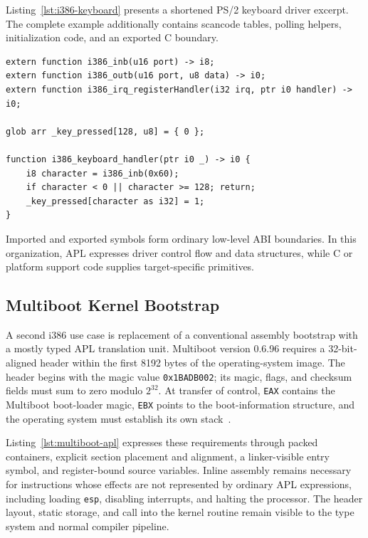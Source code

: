 \documentclass[10pt,twocolumn]{article}
\begin{document}
\par Listing~\ref{lst:i386-keyboard} presents a shortened PS/2 keyboard driver excerpt. The complete example additionally contains scancode tables, polling helpers, initialization code, and an exported C boundary.

\begin{lstlisting}[language=APL,caption={Shortened i386 PS/2 keyboard driver excerpt using C externs.},label={lst:i386-keyboard}]
extern function i386_inb(u16 port) -> i8;
extern function i386_outb(u16 port, u8 data) -> i0;
extern function i386_irq_registerHandler(i32 irq, ptr i0 handler) -> i0;

glob arr _key_pressed[128, u8] = { 0 };

function i386_keyboard_handler(ptr i0 _) -> i0 {
    i8 character = i386_inb(0x60);
    if character < 0 || character >= 128; return;
    _key_pressed[character as i32] = 1;
}
\end{lstlisting}

\par Imported and exported symbols form ordinary low-level ABI boundaries. In this organization, APL expresses driver control flow and data structures, while C or platform support code supplies target-specific primitives.

\subsection{Multiboot Kernel Bootstrap}
\label{sec:multiboot}

\par A second i386 use case is replacement of a conventional assembly bootstrap with a mostly typed APL translation unit. Multiboot version 0.6.96 requires a 32-bit-aligned header within the first 8192 bytes of the operating-system image. The header begins with the magic value \texttt{0x1BADB002}; its magic, flags, and checksum fields must sum to zero modulo \(2^{32}\). At transfer of control, \texttt{EAX} contains the Multiboot boot-loader magic, \texttt{EBX} points to the boot-information structure, and the operating system must establish its own stack~\cite{multiboot096}.
\par Listing~\ref{lst:multiboot-apl} expresses these requirements through packed containers, explicit section placement and alignment, a linker-visible entry symbol, and register-bound source variables. Inline assembly remains necessary for instructions whose effects are not represented by ordinary APL expressions, including loading \texttt{esp}, disabling interrupts, and halting the processor. The header layout, static storage, and call into the kernel routine remain visible to the type system and normal compiler pipeline.
\end{document}
